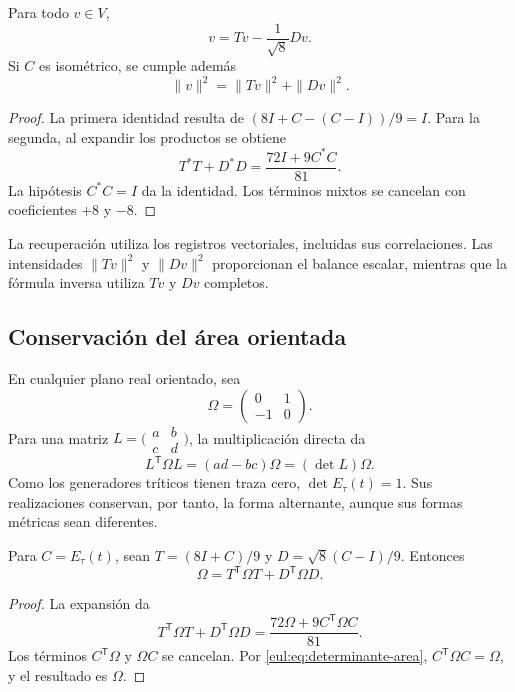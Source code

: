 \begin{proposicion}
\label{eul:prop:recuperacion}
Para todo \(v\in V\),
\begin{equation}
 v=Tv-\frac1{\sqrt8}Dv.
\label{eul:eq:recuperacion}
\end{equation}
Si \(C\) es isométrico, se cumple además
\[
 \|v\|^2=\|Tv\|^2+\|Dv\|^2.
\]
\end{proposicion}
\begin{proof}
La primera identidad resulta de
\((8I+C-(C-I))/9=I\). Para la segunda, al expandir los productos
se obtiene
\[
 T^*T+D^*D=\frac{72I+9C^*C}{81}.
\]
La hipótesis \(C^*C=I\) da la identidad. Los términos mixtos se
cancelan con coeficientes \(+8\) y \(-8\).
\end{proof}

La recuperación utiliza los registros vectoriales, incluidas sus
correlaciones. Las intensidades \(\|Tv\|^2\) y \(\|Dv\|^2\)
proporcionan el balance escalar, mientras que la fórmula inversa utiliza
\(Tv\) y \(Dv\) completos.

\subsection{Conservación del área orientada}
\label{eul:area}

En cualquier plano real orientado, sea
\[
 \Omega=\begin{pmatrix}0&1\\-1&0\end{pmatrix}.
\]
Para una matriz \(L=\bigl(\begin{smallmatrix}a&b\\c&d\end{smallmatrix}\bigr)\),
la multiplicación directa da
\begin{equation}
 L^\mathsf T\Omega L=(ad-bc)\Omega=(\det L)\Omega.
\label{eul:eq:determinante-area}
\end{equation}
Como los generadores tríticos tienen traza cero,
\(\det E_\tau(t)=1\). Sus realizaciones conservan, por tanto, la forma
alternante, aunque sus formas métricas sean diferentes.

\begin{teorema}
\label{eul:teo:area}
Para \(C=E_\tau(t)\), sean
\(T=(8I+C)/9\) y \(D=\sqrt8(C-I)/9\). Entonces
\begin{equation}
 \Omega=T^\mathsf T\Omega T+D^\mathsf T\Omega D.
\label{eul:eq:balance-area}
\end{equation}
\end{teorema}
\begin{proof}
La expansión da
\[
 T^\mathsf T\Omega T+D^\mathsf T\Omega D
 =\frac{72\Omega+9C^\mathsf T\Omega C}{81}.
\]
Los términos \(C^\mathsf T\Omega\) y \(\Omega C\) se cancelan.
Por \eqref{eul:eq:determinante-area},
\(C^\mathsf T\Omega C=\Omega\), y el resultado es \(\Omega\).
\end{proof}

